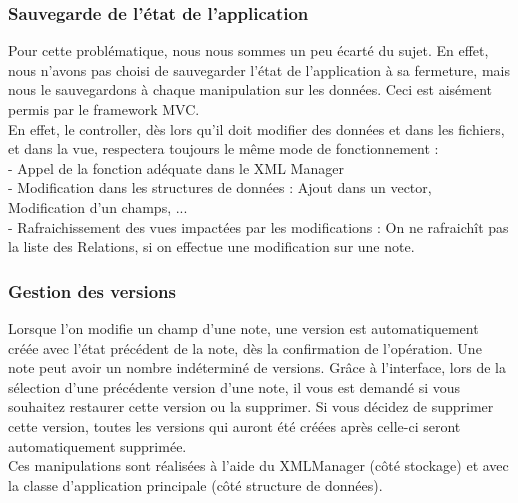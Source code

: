 \documentclass[a4paper]{report}
\begin{document}
\subsubsection{Sauvegarde de l'état de l'application}
Pour cette problématique, nous nous sommes un peu écarté du sujet. En effet, nous n'avons pas choisi de sauvegarder l'état de l'application à sa fermeture, mais nous le sauvegardons à chaque manipulation sur les données. Ceci est aisément permis par le framework MVC.\\
En effet, le controller, dès lors qu'il doit modifier des données et dans les fichiers, et dans la vue, respectera toujours le même mode de fonctionnement :\\
- Appel de la fonction adéquate dans le XML Manager \\
- Modification dans les structures de données : Ajout dans un vector, Modification d'un champs, ... \\
- Rafraichissement des vues impactées par les modifications : On ne rafraichît pas la liste des Relations, si on effectue une modification sur une note.

\subsubsection{Gestion des versions}
Lorsque l'on modifie un champ d'une note, une version est automatiquement créée avec l'état précédent de la note, dès la confirmation de l'opération. Une note peut avoir un nombre indéterminé de versions. Grâce à l'interface, lors de la sélection d'une précédente version d'une note, il vous est demandé si vous souhaitez restaurer cette version ou la supprimer. Si vous décidez de supprimer cette version, toutes les versions qui auront été créées après celle-ci seront automatiquement supprimée.\\
Ces manipulations sont réalisées à l'aide du XMLManager (côté stockage) et avec la classe d'application principale (côté structure de données).
\end{document}
